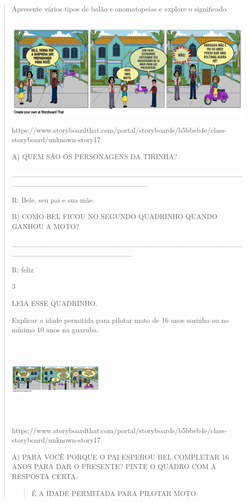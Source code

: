 {{{{\begin{verse}
{{\begin{escolha}
{{{{{Apresente vários tipos de balão e onomatopeias e explore o significado

\includegraphics[width=5.56806in,height=2.13216in]{media/image129.png}https://www.storyboardthat.com/portal/storyboards/b5bbeb4e/class-storyboard/unknown-story17

A) QUEM SÃO OS PERSONAGENS DA TIRINHA?

\_\_\_\_\_\_\_\_\_\_\_\_\_\_\_\_\_\_\_\_\_\_\_\_\_\_\_\_\_\_\_\_\_\_\_\_\_\_\_\_\_\_\_\_\_\_\_\_\_\_\_\_\_\_\_\_\_\_\_\_\_\_\_\_\_\_\_\_\_\_

R: Bele, seu pai e sua mãe.

B) COMO BEL FICOU NO SEGUNDO QUADRINHO QUANDO GANHOU A MOTO?

\_\_\_\_\_\_\_\_\_\_\_\_\_\_\_\_\_\_\_\_\_\_\_\_\_\_\_\_\_\_\_\_\_\_\_\_\_\_\_\_\_\_\_\_\_\_\_\_\_\_\_\_\_\_\_\_\_\_\_\_\_\_\_\_\_\_\_

R: feliz

\num{3}

LEIA ESSE QUADRINHO.

Explicar a idade permitida para pilotar moto de 16 anos sozinho ou no
mínimo 10 anos na guaruba.

\includegraphics[width=1.82014in,height=1.55486in]{media/image130.png}

https://www.storyboardthat.com/portal/storyboards/b5bbeb4e/class-storyboard/unknown-story17

A) PARA VOCÊ PORQUE O PAI ESPEROU BEL COMPLETAR 16 ANOS PARA DAR O
PRESENTE? PINTE O QUADRO COM A RESPOSTA CERTA.

\begin{quote}
É A IDADE PERMITADA PARA PILOTAR MOTO.


\end{quote}}}}}}
\end{escolha}}}
\end{verse}}}}}
